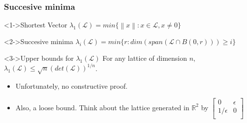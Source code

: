 \documentclass{beamer}
\newcommand{\norm}[1]{\left\lVert#1\right\rVert}
\begin{document}
\begin{frame}
    \frametitle{Succesive minima}
    \begin{block}<1->{Shortest Vector}
        $\lambda_1(\mathcal{L}) = min \{ \norm{x} : x \in \mathcal{L}, x \neq 0 \} $
    \end{block}
    \begin{block}<2->{Succesive minima}
        $\lambda_i(\mathcal{L}) = min \{ r : dim( span( \mathcal{L} \cap B(0, r) )) \geq i \} $
    \end{block}
    \begin{block}<3->{Upper bounds for $\lambda_1(\mathcal{L})$}
        For any lattice of dimension $n$, $\lambda_1(\mathcal{L}) \le \sqrt{n}(det(\mathcal{L}))^{ 1/n }$.
    \end{block}
    \begin{itemize}
        \pause \pause \pause \item Unfortunately, no constructive proof.
        \pause \item Also, a loose bound. Think about the lattice generated in $\mathbb{R}^2$ by 
        $\begin{bmatrix}
        0 & \epsilon \\
        1/\epsilon & 0 \\
        \end{bmatrix}$
    \end{itemize}
\end{frame}
\end{document}

